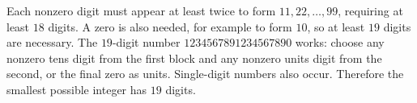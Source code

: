 Each nonzero digit must appear at least twice to form $11,22,\ldots,99$, requiring at least $18$ digits. A zero is also needed, for example to form $10$, so at least $19$ digits are necessary. The $19$-digit number $1234567891234567890$ works: choose any nonzero tens digit from the first block and any nonzero units digit from the second, or the final zero as units. Single-digit numbers also occur. Therefore the smallest possible integer has $\boxed{19}$ digits.
